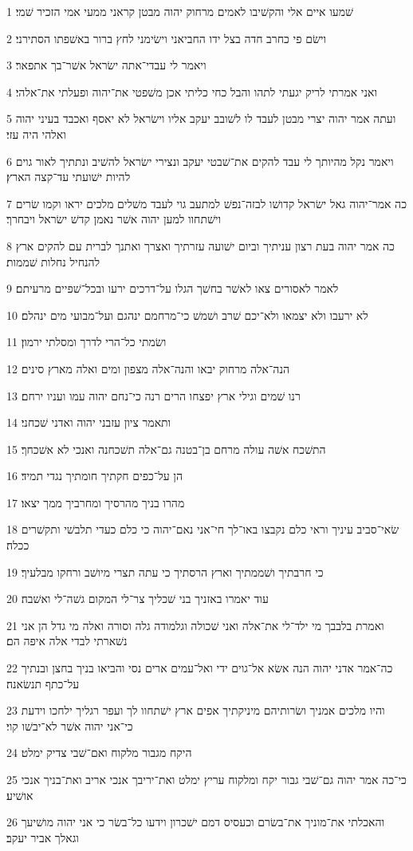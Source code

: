 \par 1 שׁמעו איים אלי והקשׁיבו לאמים מרחוק יהוה מבטן קראני ממעי אמי הזכיר שׁמי׃
\par 2 וישׂם פי כחרב חדה בצל ידו החביאני וישׂימני לחץ ברור באשׁפתו הסתירני׃
\par 3 ויאמר לי עבדי־אתה ישׂראל אשׁר־בך אתפאר׃
\par 4 ואני אמרתי לריק יגעתי לתהו והבל כחי כליתי אכן משׁפטי את־יהוה ופעלתי את־אלהי׃
\par 5 ועתה אמר יהוה יצרי מבטן לעבד לו לשׁובב יעקב אליו וישׂראל לא יאסף ואכבד בעיני יהוה ואלהי היה עזי׃
\par 6 ויאמר נקל מהיותך לי עבד להקים את־שׁבטי יעקב ונצירי ישׂראל להשׁיב ונתתיך לאור גוים להיות ישׁועתי עד־קצה הארץ׃
\par 7 כה אמר־יהוה גאל ישׂראל קדושׁו לבזה־נפשׁ למתעב גוי לעבד משׁלים מלכים יראו וקמו שׂרים וישׁתחוו למען יהוה אשׁר נאמן קדשׁ ישׂראל ויבחרך׃
\par 8 כה אמר יהוה בעת רצון עניתיך וביום ישׁועה עזרתיך ואצרך ואתנך לברית עם להקים ארץ להנחיל נחלות שׁממות׃
\par 9 לאמר לאסורים צאו לאשׁר בחשׁך הגלו על־דרכים ירעו ובכל־שׁפיים מרעיתם׃
\par 10 לא ירעבו ולא יצמאו ולא־יכם שׁרב ושׁמשׁ כי־מרחמם ינהגם ועל־מבועי מים ינהלם׃
\par 11 ושׂמתי כל־הרי לדרך ומסלתי ירמון׃
\par 12 הנה־אלה מרחוק יבאו והנה־אלה מצפון ומים ואלה מארץ סינים׃
\par 13 רנו שׁמים וגילי ארץ יפצחו הרים רנה כי־נחם יהוה עמו ועניו ירחם׃
\par 14 ותאמר ציון עזבני יהוה ואדני שׁכחני׃
\par 15 התשׁכח אשׁה עולה מרחם בן־בטנה גם־אלה תשׁכחנה ואנכי לא אשׁכחך׃
\par 16 הן על־כפים חקתיך חומתיך נגדי תמיד׃
\par 17 מהרו בניך מהרסיך ומחרביך ממך יצאו׃
\par 18 שׂאי־סביב עיניך וראי כלם נקבצו באו־לך חי־אני נאם־יהוה כי כלם כעדי תלבשׁי ותקשׁרים ככלה׃
\par 19 כי חרבתיך ושׁממתיך וארץ הרסתיך כי עתה תצרי מיושׁב ורחקו מבלעיך׃
\par 20 עוד יאמרו באזניך בני שׁכליך צר־לי המקום גשׁה־לי ואשׁבה׃
\par 21 ואמרת בלבבך מי ילד־לי את־אלה ואני שׁכולה וגלמודה גלה וסורה ואלה מי גדל הן אני נשׁארתי לבדי אלה איפה הם׃
\par 22 כה־אמר אדני יהוה הנה אשׂא אל־גוים ידי ואל־עמים ארים נסי והביאו בניך בחצן ובנתיך על־כתף תנשׂאנה׃
\par 23 והיו מלכים אמניך ושׂרותיהם מיניקתיך אפים ארץ ישׁתחוו לך ועפר רגליך ילחכו וידעת כי־אני יהוה אשׁר לא־יבשׁו קוי׃
\par 24 היקח מגבור מלקוח ואם־שׁבי צדיק ימלט׃
\par 25 כי־כה אמר יהוה גם־שׁבי גבור יקח ומלקוח עריץ ימלט ואת־יריבך אנכי אריב ואת־בניך אנכי אושׁיע׃
\par 26 והאכלתי את־מוניך את־בשׂרם וכעסיס דמם ישׁכרון וידעו כל־בשׂר כי אני יהוה מושׁיעך וגאלך אביר יעקב׃

